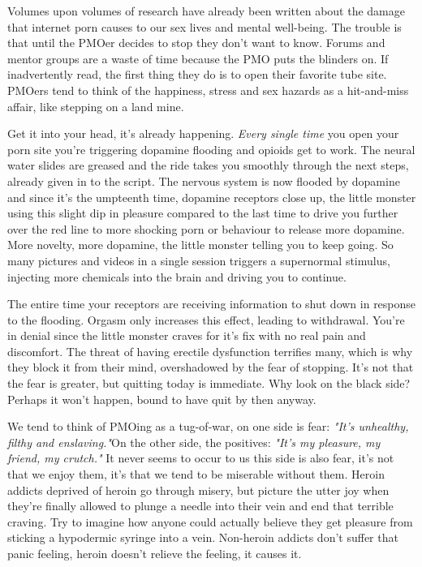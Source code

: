 \documentclass[easypeasy.tex]{subfiles}
\begin{document}
Volumes upon volumes of research have already been written about the damage that internet porn causes to our sex lives and mental well-being. The trouble is that until the PMOer decides to stop they don't want to know. Forums and mentor groups are a waste of time because the PMO puts the blinders on. If inadvertently read, the first thing they do is to open their favorite tube site. PMOers tend to think of the happiness, stress and sex hazards as a hit-and-miss affair, like stepping on a land mine.

Get it into your head, it's already happening. \textit{Every single time} you open your porn site you're triggering dopamine flooding and opioids get to work. The neural water slides are greased and the ride takes you smoothly through the next steps, already given in to the script. The nervous system is now flooded by dopamine and since it's the umpteenth time, dopamine receptors close up, the little monster using this slight dip in pleasure compared to the last time to drive you further over the red line to more shocking porn or behaviour to release more dopamine. More novelty, more dopamine, the little monster telling you to keep going. So many pictures and videos in a single session triggers a supernormal stimulus, injecting more chemicals into the brain and driving you to continue.

The entire time your receptors are receiving information to shut down in response to the flooding. Orgasm only increases this effect, leading to withdrawal. You're in denial since the little monster craves for it's fix with no real pain and discomfort. The threat of having erectile dysfunction terrifies many, which is why they block it from their mind, overshadowed by the fear of stopping. It's not that the fear is greater, but quitting today is immediate. Why look on the black side? Perhaps it won't happen, bound to have quit by then anyway.

We tend to think of PMOing as a tug-of-war, on one side is fear: \textit{"It's unhealthy, filthy and enslaving."}On the other side, the positives: \textit{"It's my pleasure, my friend, my crutch."} It never seems to occur to us this side is also fear, it's not that we enjoy them, it's that we tend to be miserable without them. Heroin addicts deprived of heroin go through misery, but picture the utter joy when they're finally allowed to plunge a needle into their vein and end that terrible craving. Try to imagine how anyone could actually believe they get pleasure from sticking a hypodermic syringe into a vein. Non-heroin addicts don't suffer that panic feeling, heroin doesn't relieve the feeling, it causes it.
\end{document}
